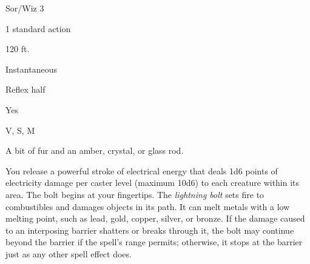 
\begin{description*}
\item[Level:] Sor/Wiz 3
\item[Casting Time:] 1 standard action
\item[Range:] 120 ft.
\item[Duration:] Instantaneous
\item[Saving Throw:] Reflex half
\item[Spell Resistance:] Yes
\item[Components:] V, S, M
\item[Arcane Material Component:] A bit of fur and an amber, crystal, or glass rod.
\end{description*}

You release a powerful stroke of electrical energy that deals 1d6 points of electricity
damage per caster level (maximum 10d6) to each creature within its area. The bolt
begins at your fingertips.
The \textit{lightning bolt} sets fire to combustibles and damages objects in its
path. It can melt metals with a low melting point, such as lead, gold, copper,
silver, or bronze. If the damage caused to an interposing barrier shatters or breaks
through it, the bolt may continue beyond the barrier if the spell's range permits;
otherwise, it stops at the barrier just as any other spell effect does.